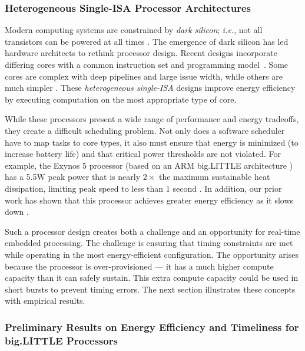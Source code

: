  
\subsubsection{Heterogeneous Single-ISA Processor Architectures}
Modern computing systems are constrained by \emph{dark silicon};
\emph{i.e.}, not all transistors can be powered at all times
\cite{DaSi2011,Venkatesh2010}.  The emergence of dark silicon has led
hardware architects to rethink processor design.  Recent designs
incorporate differing cores with a common instruction set and
programming model~\cite{Kumar.2005.heterogeneous,SulemanMQP09}.  Some
cores are complex with deep pipelines and large issue width, while
others are much simpler \cite{bigLittle}.  These \emph{heterogeneous
single-ISA} designs improve energy efficiency by executing computation
on the most appropriate type of core.

While these processors present a wide range of performance and energy
tradeoffs, they create a difficult scheduling problem.  Not only does
a software scheduler have to map tasks to core types, it also must
ensure that energy is minimized (to increase battery life) and that
critical power thresholds are not violated.  For example, the Exynos
5 processor (based on an ARM big.LITTLE architecture \cite{bigLittle})
has a 5.5W peak power that is nearly $2 \times$ the maximum
sustainable heat dissipation, limiting peak speed to less than 1
second \cite{exynos5}.  In addition, our prior work has shown that
this processor achieves greater energy efficiency as it slows down
\cite{Imes2014,Imes2014a}.  

Such a processor design creates both a challenge and an opportunity
for real-time embedded processing. The challenge is ensuring that
timing constraints are met while operating in the most
energy-efficient configuration.  The opportunity arises because the
processor is over-provisioned --- it has a much higher compute capacity
than it can safely sustain.  This extra compute capacity could be used
in short bursts to prevent timing errors.  The next section
illustrates these concepts with empirical results.

\subsubsection{Preliminary Results on Energy Efficiency and Timeliness
  for big.LITTLE Processors}

